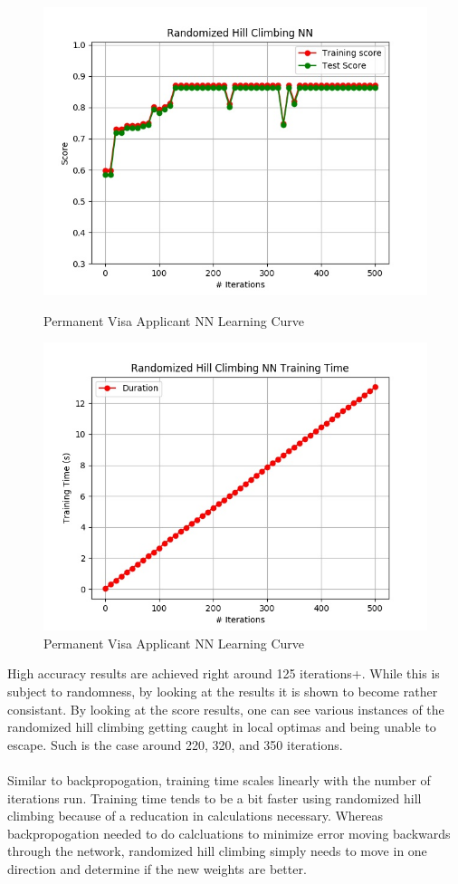 \documentclass[h]{article}
\begin{document}
 \begin{figure}[H]
      \includegraphics[width=1\textwidth,keepaspectratio]{randomized_hill_climbing_nn.jpg} 
      \caption*{Permanent Visa Applicant NN Learning Curve} 
   \endminipage\hfill
      \includegraphics[width=1\textwidth,keepaspectratio]{randomized_hill_climbing_nn_time.jpg} 
      \caption*{Permanent Visa Applicant NN Learning Curve} 
   \endminipage\hfill
\end{figure}

High accuracy results are achieved right around 125 iterations+.  
While this is subject to randomness, by looking at the results it is shown to 
become rather consistant.  By looking at the score results, one can see various 
instances of the randomized hill climbing getting caught in local optimas and 
being unable to escape.  Such is the case around 220, 320, and 350 iterations.
\\ \\
Similar to backpropogation, training time scales linearly with the number of 
 iterations run. Training time tends to be a bit faster using randomized hill 
 climbing because of a reducation in calculations necessary.  Whereas 
 backpropogation needed to do calcluations to minimize error moving backwards 
 through the network, randomized hill climbing simply needs to move in one 
 direction and determine if the new weights are better.
 
\end{document}
